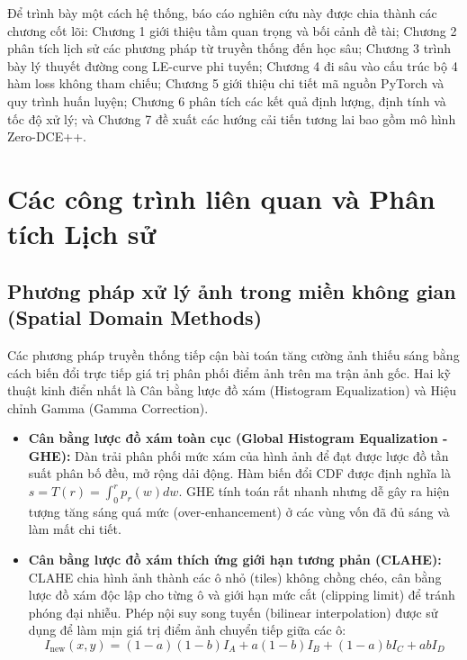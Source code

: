 \documentclass[a4paper]{article}
\begin{document}
Để trình bày một cách hệ thống, báo cáo nghiên cứu này được chia thành các chương cốt lõi: Chương 1 giới thiệu tầm quan trọng và bối cảnh đề tài; Chương 2 phân tích lịch sử các phương pháp từ truyền thống đến học sâu; Chương 3 trình bày lý thuyết đường cong LE-curve phi tuyến; Chương 4 đi sâu vào cấu trúc bộ 4 hàm loss không tham chiếu; Chương 5 giới thiệu chi tiết mã nguồn PyTorch và quy trình huấn luyện; Chương 6 phân tích các kết quả định lượng, định tính và tốc độ xử lý; và Chương 7 đề xuất các hướng cải tiến tương lai bao gồm mô hình Zero-DCE++.

\clearpage

\section{Các công trình liên quan và Phân tích Lịch sử}

\subsection{Phương pháp xử lý ảnh trong miền không gian (Spatial Domain Methods)}
Các phương pháp truyền thống tiếp cận bài toán tăng cường ảnh thiếu sáng bằng cách biến đổi trực tiếp giá trị phân phối điểm ảnh trên ma trận ảnh gốc. Hai kỹ thuật kinh điển nhất là Cân bằng lược đồ xám (Histogram Equalization) và Hiệu chỉnh Gamma (Gamma Correction).
\begin{itemize}
    \item \textbf{Cân bằng lược đồ xám toàn cục (Global Histogram Equalization - GHE):} Dàn trải phân phối mức xám của hình ảnh để đạt được lược đồ tần suất phân bố đều, mở rộng dải động. Hàm biến đổi CDF được định nghĩa là $s = T(r) = \int_{0}^{r} p_r(w) dw$. GHE tính toán rất nhanh nhưng dễ gây ra hiện tượng tăng sáng quá mức (over-enhancement) ở các vùng vốn đã đủ sáng và làm mất chi tiết.
    \item \textbf{Cân bằng lược đồ xám thích ứng giới hạn tương phản (CLAHE):} CLAHE chia hình ảnh thành các ô nhỏ (tiles) không chồng chéo, cân bằng lược đồ xám độc lập cho từng ô và giới hạn mức cắt (clipping limit) để tránh phóng đại nhiễu. Phép nội suy song tuyến (bilinear interpolation) được sử dụng để làm mịn giá trị điểm ảnh chuyển tiếp giữa các ô:
    \begin{equation}
        I_{\text{new}}(x, y) = (1-a)(1-b)I_A + a(1-b)I_B + (1-a)bI_C + abI_D
    \end{equation}
\end{itemize}
\end{document}
